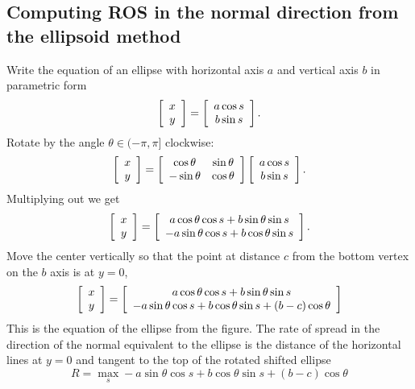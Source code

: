 \documentclass{article}
\begin{document}
\subsection{Computing ROS in the normal direction from the ellipsoid method}
Write the equation of an ellipse with horizontal axis $a$ and vertical axis
$b$ in parametric form
$$
\left[
\begin{array}
[c]{c}
x\\
y
\end{array}
\right]  =\left[
\begin{array}
[c]{c}
a\cos s\\
b\sin s
\end{array}
\right] .
$$
Rotate by the angle $\theta\in(-\pi,\pi]$ clockwise:
$$
\left[
\begin{array}
[c]{c}
x\\
y
\end{array}
\right]  =\left[
\begin{array}
[c]{cc}
\cos\theta & \sin\theta\\
-\sin\theta & \cos\theta
\end{array}
\right]  \left[
\begin{array}
[c]{c}
a\cos s\\
b\sin s
\end{array}
\right]  .
$$
Multiplying out we get
$$
\left[
\begin{array}
[c]{c}
x\\
y
\end{array}
\right]  =\left[
\begin{array}
[c]{c}
a\cos\theta\cos s+b\sin\theta\sin s\\
-a\sin\theta\cos s+b\cos\theta\sin s
\end{array}
\right]  .
$$
Move the center vertically so that the point at distance $c$ from the bottom
vertex on the $b$ axis is at $y=0$,
$$
\left[
\begin{array}
[c]{c}
x\\
y
\end{array}
\right]  =\left[
\begin{array}
[c]{c}
a\cos\theta\cos s+b\sin\theta\sin s\\
-a\sin\theta\cos s+b\cos\theta\sin s+(b-c)\cos\theta
\end{array}
\right]
$$
This is the equation of the ellipse from the figure. The rate of spread in the
direction of the normal equivalent to the ellipse is the distance of the
horizontal lines at $y=0$ and tangent to the top of the rotated shifted
ellipse
$$
R=\max_{s}-a\sin\theta\cos s+b\cos\theta\sin s+(b-c)\cos\theta
$$
\end{document}
